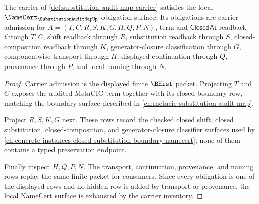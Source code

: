 \begin{theorem}
\label{thm:substitution-audit-map-namecert-obligations}
The carrier of \autoref{def:substitution-audit-map-carrier} satisfies the local $\NameCert_{\SubstitutionAuditMapUp}$ obligation surface. Its obligations are carrier admission for $A=(T,C,R,S,K,G,H,Q,P,N)$, term and $\mathsf{ClosedAt}$ readback through $T,C$, shift readback through $R$, substitution readback through $S$, closed-composition readback through $K$, generator-closure classification through $G$, componentwise transport through $H$, displayed continuation through $Q$, provenance through $P$, and local naming through $N$.
\end{theorem}
\begin{proof}
Carrier admission is the displayed finite $\BHist$ packet. Projecting $T$ and $C$ exposes the audited MetaCIC term together with its closed-boundary row, matching the boundary surface described in \autoref{ch:metacic-substitution-audit-map}.

Project $R,S,K,G$ next. These rows record the checked closed shift, closed substitution, closed-composition, and generator-closure classifier surfaces used by \autoref{ch:concrete-instances-closed-substitution-boundary-namecert}; none of them contains a typed preservation endpoint.

Finally inspect $H,Q,P,N$. The transport, continuation, provenance, and naming rows replay the same finite packet for consumers. Since every obligation is one of the displayed rows and no hidden row is added by transport or provenance, the local NameCert surface is exhausted by the carrier inventory.
\end{proof}

